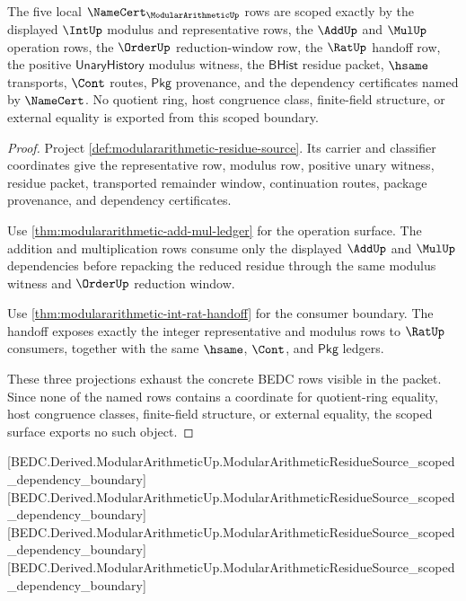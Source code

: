\begin{theorem}
\label{thm:modulararithmetic-scoped-dependency-boundary}
The five local $\NameCert_{\ModularArithmeticUp}$ rows are scoped exactly by the displayed $\IntUp$ modulus and representative rows, the $\AddUp$ and $\MulUp$ operation rows, the $\OrderUp$ reduction-window row, the $\RatUp$ handoff row, the positive $\mathsf{UnaryHistory}$ modulus witness, the $\mathsf{BHist}$ residue packet, $\hsame$ transports, $\Cont$ routes, $\mathsf{Pkg}$ provenance, and the dependency certificates named by $\NameCert$. No quotient ring, host congruence class, finite-field structure, or external equality is exported from this scoped boundary.
\end{theorem}
\begin{proof}
Project \autoref{def:modulararithmetic-residue-source}. Its carrier and classifier coordinates give the representative row, modulus row, positive unary witness, residue packet, transported remainder window, continuation routes, package provenance, and dependency certificates.

Use \autoref{thm:modulararithmetic-add-mul-ledger} for the operation surface. The addition and multiplication rows consume only the displayed $\AddUp$ and $\MulUp$ dependencies before repacking the reduced residue through the same modulus witness and $\OrderUp$ reduction window.

Use \autoref{thm:modulararithmetic-int-rat-handoff} for the consumer boundary. The handoff exposes exactly the integer representative and modulus rows to $\RatUp$ consumers, together with the same $\hsame$, $\Cont$, and $\mathsf{Pkg}$ ledgers.

These three projections exhaust the concrete BEDC rows visible in the packet. Since none of the named rows contains a coordinate for quotient-ring equality, host congruence classes, finite-field structure, or external equality, the scoped surface exports no such object.
\end{proof}

[BEDC.Derived.ModularArithmeticUp.ModularArithmeticResidueSource\_scoped\_dependency\_boundary]
[BEDC.Derived.ModularArithmeticUp.ModularArithmeticResidueSource\_scoped\_dependency\_boundary]
[BEDC.Derived.ModularArithmeticUp.ModularArithmeticResidueSource\_scoped\_dependency\_boundary]
[BEDC.Derived.ModularArithmeticUp.ModularArithmeticResidueSource\_scoped\_dependency\_boundary]

